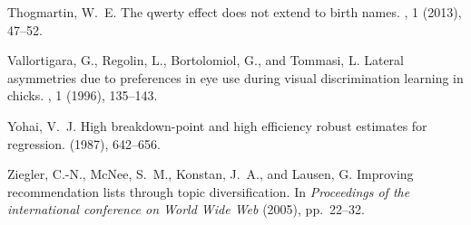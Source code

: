 \documentclass[letterpaper]{sig-alternate-2013}
\begin{document}
\begin{thebibliography}{10}
{\sc Thogmartin, W.~E.}
\newblock The qwerty effect does not extend to birth names.
, 1 (2013), 47--52.

{\sc Vallortigara, G., Regolin, L., Bortolomiol, G., and Tommasi, L.}
\newblock Lateral asymmetries due to preferences in eye use during visual
  discrimination learning in chicks.
, 1 (1996), 135--143.

{\sc Yohai, V.~J.}
\newblock High breakdown-point and high efficiency robust estimates for
  regression.
 (1987), 642--656.

{\sc Ziegler, C.-N., McNee, S.~M., Konstan, J.~A., and Lausen, G.}
\newblock Improving recommendation lists through topic diversification.
\newblock In {\em Proceedings of the international conference on World Wide
  Web\/} (2005), pp.~22--32.

\end{thebibliography}
\end{document}
